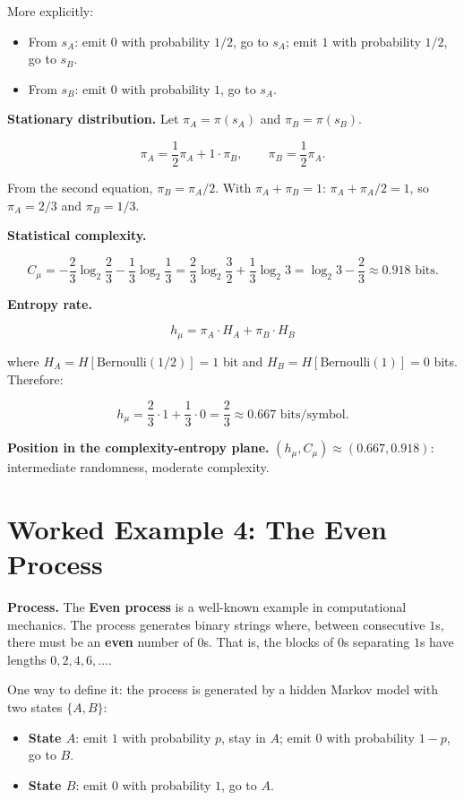 More explicitly:
\begin{itemize}
\item From $s_A$: emit $0$ with probability $1/2$, go to $s_A$; emit $1$ with probability $1/2$, go to $s_B$.
\item From $s_B$: emit $0$ with probability $1$, go to $s_A$.
\end{itemize}

\textbf{Stationary distribution.} Let $\pi_A = \pi(s_A)$ and $\pi_B = \pi(s_B)$.

\[\pi_A = \frac{1}{2}\pi_A + 1 \cdot \pi_B, \qquad \pi_B = \frac{1}{2}\pi_A.\]

From the second equation, $\pi_B = \pi_A/2$. With $\pi_A + \pi_B = 1$: $\pi_A + \pi_A/2 = 1$, so $\pi_A = 2/3$ and $\pi_B = 1/3$.

\textbf{Statistical complexity.}

\[C_\mu = -\frac{2}{3}\log_2\frac{2}{3} - \frac{1}{3}\log_2\frac{1}{3} = \frac{2}{3}\log_2\frac{3}{2} + \frac{1}{3}\log_2 3 = \log_2 3 - \frac{2}{3} \approx 0.918 \text{ bits}.\]

\textbf{Entropy rate.}

\[h_\mu = \pi_A \cdot H_A + \pi_B \cdot H_B\]

where $H_A = H[\text{Bernoulli}(1/2)] = 1$ bit and $H_B = H[\text{Bernoulli}(1)] = 0$ bits. Therefore:

\[h_\mu = \frac{2}{3} \cdot 1 + \frac{1}{3} \cdot 0 = \frac{2}{3} \approx 0.667 \text{ bits/symbol}.\]

\textbf{Position in the complexity-entropy plane.} $(h_\mu, C_\mu) \approx (0.667, 0.918)$: intermediate randomness, moderate complexity.



\section{Worked Example 4: The Even Process}

\textbf{Process.} The \textbf{Even process} is a well-known example in computational mechanics. The process generates binary strings where, between consecutive $1$s, there must be an \textbf{even} number of $0$s. That is, the blocks of $0$s separating $1$s have lengths $0, 2, 4, 6, \ldots$.

One way to define it: the process is generated by a hidden Markov model with two states $\{ A, B\} $:

\begin{itemize}
\item \textbf{State $A$}: emit $1$ with probability $p$, stay in $A$; emit $0$ with probability $1-p$, go to $B$.
\item \textbf{State $B$}: emit $0$ with probability $1$, go to $A$.
\end{itemize}

